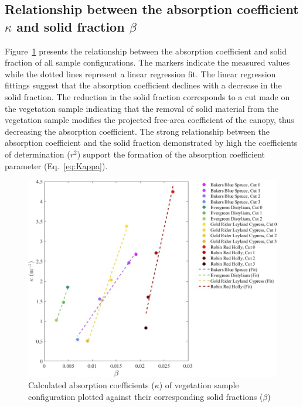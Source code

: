 \documentclass[12pt]{article}
\begin{document}
\subsection{Relationship between the absorption coefficient $\kappa$ and solid fraction $\beta$ }

Figure~\ref{fig:betavkappa} presents the relationship between the absorption coefficient and solid fraction of all sample configurations. The markers indicate the measured values while the dotted lines represent a linear regression fit. The linear regression fittings suggest that the absorption coefficient declines with a decrease in the solid fraction. The reduction in the solid fraction corresponds to a cut made on the vegetation sample indicating that the removal of solid material from the vegetation sample modifies the projected free-area coefficient of the canopy, thus decreasing the absorption coefficient. The strong relationship between the absorption coefficient and the solid fraction demonstrated by high the coefficients of determination ($r^2$) support the formation of the absorption coefficient parameter (Eq.~\ref{eq:Kappa}).

\begin{figure}[!]
	\centering 	
    \includegraphics[width=1\linewidth]{Picture12.jpg}
	\caption[Comparison of absorption coefficient, $\kappa$, and volume ratio, $\beta$]{Calculated absorption coefficients ($\kappa$) of vegetation sample configuration plotted against their corresponding solid fractions ($\beta$)}
	\label{fig:betavkappa}
\end{figure}
\end{document}
